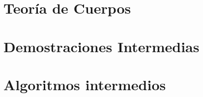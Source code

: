 \documentclass[10pt]{article}
\newcommand{\0}{\mathbf{0}}
\newcommand{\1}{\mathbf{1}}
\newcommand{\+}{\oplus}
\theoremstyle{definition}
\theoremstyle{remark}
\theoremstyle{remark}
\begin{document}
\newpage

\section{Teoría de Cuerpos}
\label{app-cuerpos}


\newpage

\section{Demostraciones Intermedias}
\label{sec-demos-inter}


\newpage

\section{Algoritmos intermedios}
\label{sec-app-alg-int}

\end{document}
